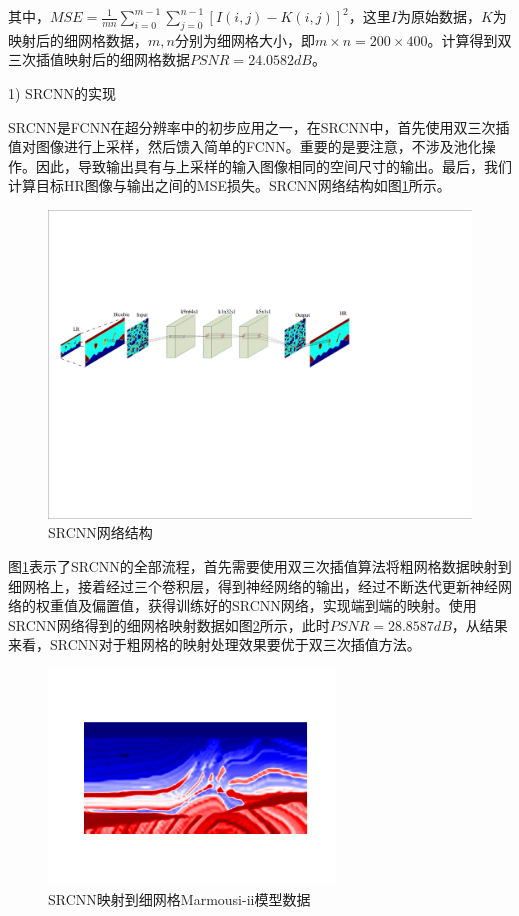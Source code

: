 \documentclass[11pt]{article}
\begin{document}
其中，$MSE=\frac{1}{mn}\sum_{i=0}^{m-1}\sum_{j=0}^{n-1} [ I(i,j)-K(i,j) ]^2$，这里$I$为原始数据，$K$为映射后的细网格数据，$m,n$分别为细网格大小，即$m \times n=200 \times 400$。计算得到双三次插值映射后的细网格数据$PSNR=24.0582dB$。
\par
1) SRCNN的实现
\par
SRCNN是FCNN在超分辨率中的初步应用之一，在SRCNN中，首先使用双三次插值对图像进行上采样，然后馈入简单的FCNN。重要的是要注意，不涉及池化操作。因此，导致输出具有与上采样的输入图像相同的空间尺寸的输出。最后，我们计算目标HR图像与输出之间的MSE损失。SRCNN网络结构如图\ref{Fig_SRCNN}所示。
\begin{figure}[htbp]
\centering
\includegraphics[width=5.5in]{./FigureFolder/Foundation/SuperResolution/SRCNN/SRCNN.pdf}
\caption{SRCNN网络结构}
\label{Fig_SRCNN}
\end{figure}
\par
图\ref{Fig_SRCNN}表示了SRCNN的全部流程，首先需要使用双三次插值算法将粗网格数据映射到细网格上，接着经过三个卷积层，得到神经网络的输出，经过不断迭代更新神经网络的权重值及偏置值，获得训练好的SRCNN网络，实现端到端的映射。使用SRCNN网络得到的细网格映射数据如图\ref{Fig_HRSRCNN}所示，此时$PSNR=28.8587dB$，从结果来看，SRCNN对于粗网格的映射处理效果要优于双三次插值方法。
\begin{figure}[htbp]
\centering
\includegraphics[width=3in]{./FigureFolder/Foundation/SuperResolution/SRCNN/HR_Marmousi.pdf}
\caption{SRCNN映射到细网格Marmousi-ii模型数据}
\label{Fig_HRSRCNN}
\end{figure}
\end{document}
